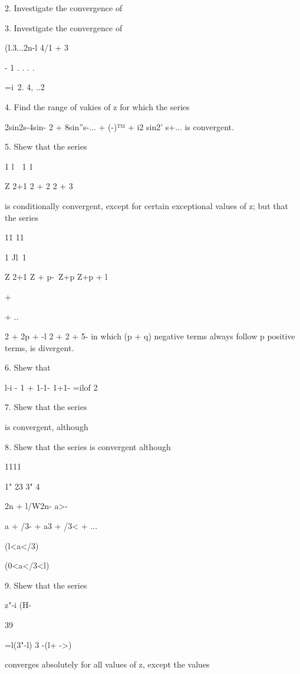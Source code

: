 2. Investigate the convergence of

3. Investigate the convergence of

(l.3...2n-l 4/1 + 3


- 1 . . . . 

 =i\ 2. 4, ..2%

4. Find the range of vakies of z for which the series

2sin2s-4sin- 2 + 8sin''s-... + (-)™ + i2 sin2' s+... is convergent.

5. Shew that the series

1 l\ \ 1 1\

Z 2+1 2 + 2 2 + 3

is conditionally convergent, except for certain exceptional values of
z; but that the series

11 11

1 Jl\ 1

Z 2+1 Z + p-\ Z+p Z+p + l

+

+ ..

2 + 2p + -l 2 + 2 + 5- in which (p + q) negative terms always follow p
positive terms, is divergent. 

6. Shew that

l-i - 1 + 1-1- 1+1- =ilof 2

7. Shew that the series

is convergent, although

8. Shew that the series is convergent although

1111

1" 23 3" 4

 2n + l/W2n- a>-

a + /3- + a3 + /3< + ...

 (l<a</3)


(0<a</3<l)


%
%

9. Shew that the series

   z"-i (H-%

39

 =l(3"-l) 3 -(l+ ->)

converges absolutely for all values of z, except the values

